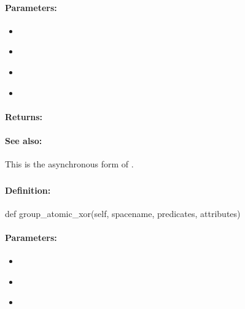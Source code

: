 \paragraph{Parameters:}
\begin{itemize}[noitemsep]
\item {}\\

\item {}\\

\item {}\\

\item {}\\

\end{itemize}

\paragraph{Returns:}


\paragraph{See also:}  This is the asynchronous form of .

\pagebreak
\subsubsection{}
\label{api:python:group_atomic_xor}


\paragraph{Definition:}
\begin{pythoncode}
def group_atomic_xor(self, spacename, predicates, attributes)
\end{pythoncode}

\paragraph{Parameters:}
\begin{itemize}[noitemsep]
\item {}\\

\item {}\\

\item {}\\

\end{itemize}

